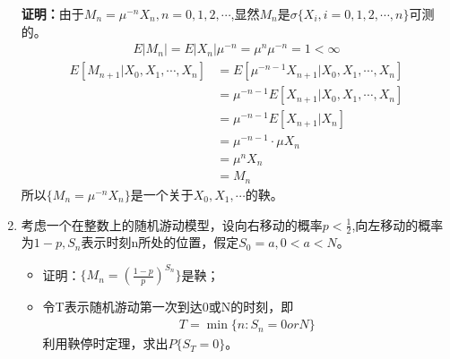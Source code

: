 \begin{enumerate}
	      \textbf{证明：}由于\(M_n=\mu^{-n}X_n,n=0,1,2,\cdots\),显然\(M_n\)是\(\sigma\{X_i,i=0,1,2,\cdots,n\}\)可测的。
	      \begin{align*}
		      E|M_n|=E|X_n|\mu^{-n}=\mu^{n}\mu^{-n}=1<\infty
	      \end{align*}
	      \begin{align*}
		      E[M_{n+1}|X_0,X_1,\cdots,X_n]
		       & =E[\mu^{-n-1}X_{n+1}|X_0,X_1,\cdots,X_n] \\
		       & =\mu^{-n-1}E[X_{n+1}|X_0,X_1,\cdots,X_n] \\
		       & =\mu^{-n-1}E[X_{n+1}|X_n]                \\
		       & =\mu^{-n-1}\cdot \mu X_n                 \\
		       & =\mu^{n}X_n                              \\
		       & =M_n
	      \end{align*}
	      所以\(\{M_n=\mu^{-n}X_n\}\)是一个关于\(X_0,X_1,\cdots\)的鞅。
	\item 考虑一个在整数上的随机游动模型，设向右移动的概率\(p<\frac{1}{2}\),向左移动的概率为\(1-p,S_n\)表示时刻n所处的位置，假定\(S_0=a,0<a<N\)。
	      \begin{itemize}[\bfseries (1)]
		      \item 证明：\(\{M_n=\left(\frac{1-p}{p}\right)^{S_n}\}\)是鞅；
		      \item 令T表示随机游动第一次到达0或N的时刻，即
		            \begin{align*}
			            T=\min\{n:S_n=0orN\}
		            \end{align*}
		            利用鞅停时定理，求出\(P\{S_T=0\}\)。
	      \end{itemize}


\end{enumerate}
